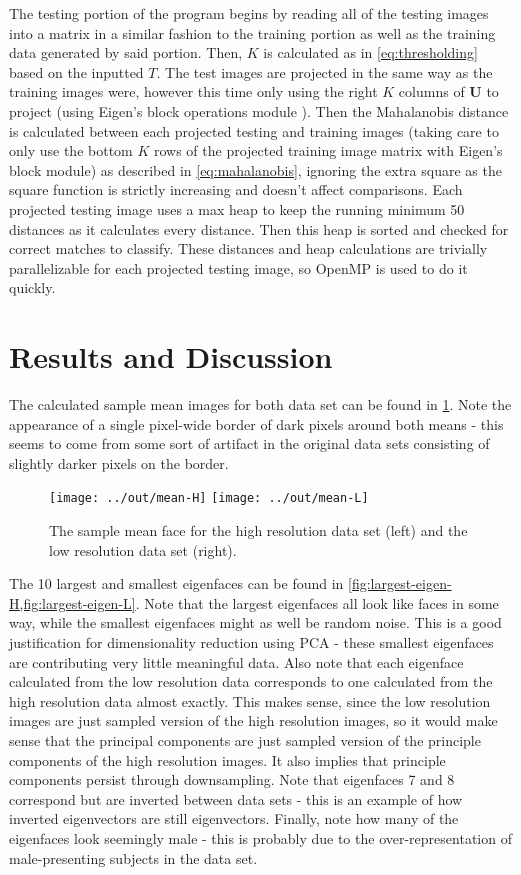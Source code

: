 \documentclass[headings=optiontoheadandtoc,listof=totoc,parskip=full]{scrartcl}
\begin{document}
The testing portion of the program begins by reading all of the testing images into a matrix in a similar fashion to the training portion as well as the training data generated by said portion. Then, $K$ is calculated as in \cref{eq:thresholding} based on the inputted $T$. The test images are projected in the same way as the training images were, however this time only using the right $K$ columns of $\mathbf U$ to project (using Eigen's block operations module \autocite{eigenBlock}). Then the Mahalanobis distance is calculated between each projected testing and training images (taking care to only use the bottom $K$ rows of the projected training image matrix with Eigen's block module) as described in \cref{eq:mahalanobis}, ignoring the extra square as the square function is strictly increasing and doesn't affect comparisons. Each projected testing image uses a max heap to keep the running minimum 50 distances as it calculates every distance. Then this heap is sorted and checked for correct matches to classify. These distances and heap calculations are trivially parallelizable for each projected testing image, so OpenMP is used to do it quickly.

\section{Results and Discussion}
\label{sec:results}

The calculated sample mean images for both data set can be found in \cref{fig:sample-means}. Note the appearance of a single pixel-wide border of dark pixels around both means - this seems to come from some sort of artifact in the original data sets consisting of slightly darker pixels on the border.

\begin{figure}[H]
	\centering
	\texttt{[image: ../out/mean-H]} \qquad
	\texttt{[image: ../out/mean-L]}
	\caption{The sample mean face for the high resolution data set (left) and the low resolution data set (right).}
	\label{fig:sample-means}
\end{figure}

The 10 largest and smallest eigenfaces can be found in \cref{fig:largest-eigen-H,fig:largest-eigen-L}. Note that the largest eigenfaces all look like faces in some way, while the smallest eigenfaces might as well be random noise. This is a good justification for dimensionality reduction using PCA - these smallest eigenfaces are contributing very little meaningful data. Also note that each eigenface calculated from the low resolution data corresponds to one calculated from the high resolution data almost exactly. This makes sense, since the low resolution images are just sampled version of the high resolution images, so it would make sense that the principal components are just sampled version of the principle components of the high resolution images. It also implies that principle components persist through downsampling. Note that eigenfaces 7 and 8 correspond but are inverted between data sets - this is an example of how inverted eigenvectors are still eigenvectors. Finally, note how many of the eigenfaces look seemingly male - this is probably due to the over-representation of male-presenting subjects in the data set.
\end{document}
